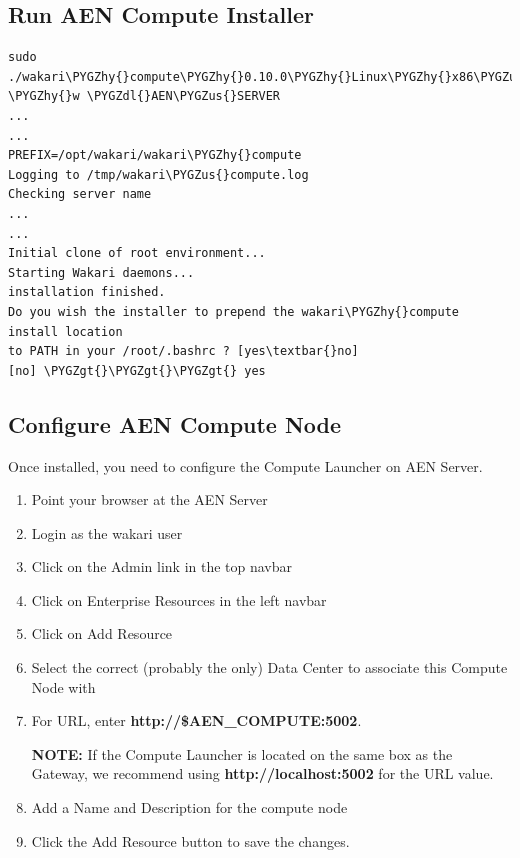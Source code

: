 \documentclass[letterpaper,10pt,openany,oneside]{sphinxmanual}
\def\PYGZus{\char`\_}
\def\PYGZgt{\char`\>}
\def\PYGZdl{\char`\$}
\def\PYGZhy{\char`\-}
\begin{document}
\subsection{Run AEN Compute Installer}
\label{AnacondaEnterpriseNotebooks:run-aen-compute-installer}
\begin{Verbatim}[commandchars=\\\{\}]
sudo ./wakari\PYGZhy{}compute\PYGZhy{}0.10.0\PYGZhy{}Linux\PYGZhy{}x86\PYGZus{}64.sh \PYGZhy{}w \PYGZdl{}AEN\PYGZus{}SERVER
...
...
PREFIX=/opt/wakari/wakari\PYGZhy{}compute
Logging to /tmp/wakari\PYGZus{}compute.log
Checking server name
...
...
Initial clone of root environment...
Starting Wakari daemons...
installation finished.
Do you wish the installer to prepend the wakari\PYGZhy{}compute install location
to PATH in your /root/.bashrc ? [yes\textbar{}no]
[no] \PYGZgt{}\PYGZgt{}\PYGZgt{} yes
\end{Verbatim}


\subsection{Configure AEN Compute Node}
\label{AnacondaEnterpriseNotebooks:configure-aen-compute-node}
Once installed, you need to configure the Compute Launcher on AEN Server.
\begin{enumerate}
\item {} 
Point your browser at the AEN Server

\item {} 
Login as the wakari user

\item {} 
Click on the Admin link in the top navbar

\item {} 
Click on Enterprise Resources in the left navbar

\item {} 
Click on Add Resource

\item {} 
Select the correct (probably the only) Data Center to associate this
Compute Node with

\item {} 
For URL, enter \textbf{http://\$AEN\_COMPUTE:5002}.

\textbf{NOTE:} If the Compute Launcher is located on the same box as the
Gateway, we recommend using \textbf{http://localhost:5002} for the URL
value.

\item {} 
Add a Name and Description for the compute node

\item {} 
Click the Add Resource button to save the changes.

\end{enumerate}
\end{document}
